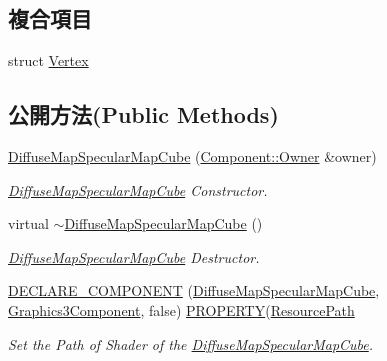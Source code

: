 \subsection*{複合項目}
\begin{DoxyCompactItemize}
\item 
struct \hyperlink{struct_magnum_1_1_diffuse_map_specular_map_cube_1_1_vertex}{Vertex}
\end{DoxyCompactItemize}
\subsection*{公開方法(Public Methods)}
\begin{DoxyCompactItemize}
\item 
\hyperlink{class_magnum_1_1_diffuse_map_specular_map_cube_adaa353296be9f47b4df863e4759716df}{Diffuse\+Map\+Specular\+Map\+Cube} (\hyperlink{class_magnum_1_1_component_1_1_owner}{Component\+::\+Owner} \&owner)
\begin{DoxyCompactList}\small\item\em \hyperlink{class_magnum_1_1_diffuse_map_specular_map_cube}{Diffuse\+Map\+Specular\+Map\+Cube} Constructor. \end{DoxyCompactList}\item 
virtual \hyperlink{class_magnum_1_1_diffuse_map_specular_map_cube_a723855f16958025f5fefdb679df736d1}{$\sim$\+Diffuse\+Map\+Specular\+Map\+Cube} ()
\begin{DoxyCompactList}\small\item\em \hyperlink{class_magnum_1_1_diffuse_map_specular_map_cube}{Diffuse\+Map\+Specular\+Map\+Cube} Destructor. \end{DoxyCompactList}\item 
\hyperlink{class_magnum_1_1_diffuse_map_specular_map_cube_a955af7a527ae003505a4e24fdee5a111}{D\+E\+C\+L\+A\+R\+E\+\_\+\+C\+O\+M\+P\+O\+N\+E\+NT} (\hyperlink{class_magnum_1_1_diffuse_map_specular_map_cube}{Diffuse\+Map\+Specular\+Map\+Cube}, \hyperlink{class_magnum_1_1_graphics3_component}{Graphics3\+Component}, false)       \hyperlink{class_magnum_1_1_diffuse_map_specular_map_cube_ad5d896d73490a7c8c03c9968a762d359}{P\+R\+O\+P\+E\+R\+TY}(\hyperlink{class_magnum_1_1_resource_path}{Resource\+Path}
\begin{DoxyCompactList}\small\item\em Set the Path of Shader of the \hyperlink{class_magnum_1_1_diffuse_map_specular_map_cube}{Diffuse\+Map\+Specular\+Map\+Cube}. \end{DoxyCompactList}\item 

\end{DoxyCompactItemize}
